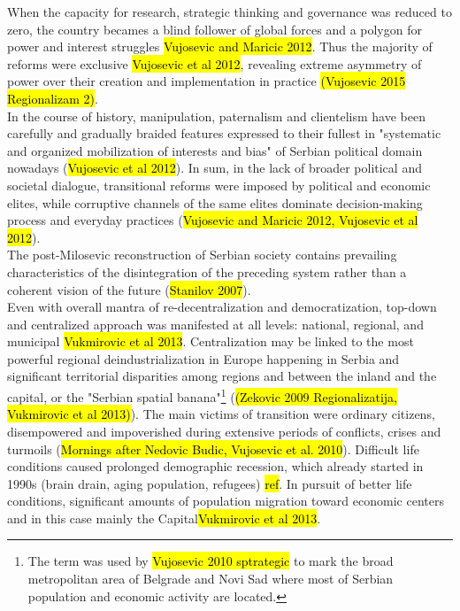 \documentclass[11pt]{report}
\begin{document}
When the capacity for research, strategic thinking and governance was reduced to zero, the country becames a blind follower of global forces and a polygon for power and interest struggles \hl{Vujosevic and Maricic 2012}.
Thus the majority of reforms were exclusive \hl{Vujosevic et al 2012}, revealing extreme asymmetry of power over their creation and implementation in practice \hl{(Vujosevic 2015 Regionalizam 2)}.
\\
In the course of history, manipulation, paternalism and clientelism have been carefully and gradually braided features expressed to their fullest in  "systematic and organized mobilization of interests and bias" of Serbian political domain nowadays (\hl{Vujosevic et al 2012}).
In sum, in the lack of broader political and societal dialogue, transitional reforms were imposed by political and economic elites, while corruptive channels of the same elites dominate decision-making process and everyday practices (\hl{Vujosevic and Maricic 2012, Vujosevic et al 2012}). 
\\
The post-Milosevic reconstruction of Serbian society contains prevailing characteristics of the disintegration of the preceding system rather than a coherent vision of the future (\hl{Stanilov 2007}). 
\\
Even with overall mantra of re-decentralization and democratization, top-down and centralized approach was manifested at all levels: national, regional, and municipal \hl{Vukmirovic et al 2013}. Centralization may be linked to the most powerful regional deindustrialization in Europe happening in Serbia and significant territorial disparities among regions and between the inland and the capital, or the "Serbian spatial banana"\footnote{The term was used by \hl{Vujosevic 2010 sptrategic} to mark the broad metropolitan area of Belgrade and Novi Sad where most of Serbian population and economic activity are located.} (\hl{(Zekovic 2009 Regionalizatija, Vukmirovic et al 2013)}).
The main victims of transition were ordinary citizens, disempowered and impoverished during extensive periods of conflicts, crises and turmoils (\hl{Mornings after Nedovic Budic, Vujosevic et al. 2010}). 
Difficult life conditions caused prolonged demographic recession, which already started in 1990s (brain drain, aging population, refugees) \hl{ref}.
In pursuit of better life conditions, significant amounts of population migration toward economic centers and in this case mainly the Capital\hl{Vukmirovic et al 2013}.
\\
\end{document}
